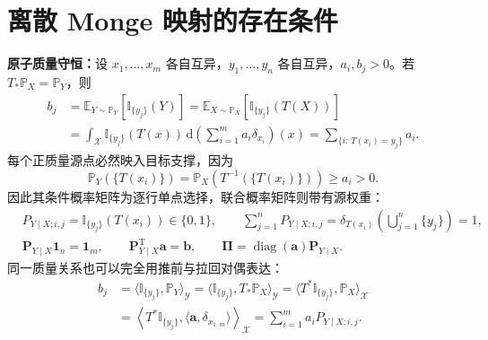 \section{离散 Monge 映射的存在条件}\label{cw:app:monge}

\textbf{原子质量守恒：}设 $x_1,\dots,x_m$ 各自互异，$y_1,\dots,y_n$ 各自互异，$a_i,b_j>0$。若 $T_*\mathbb P_X=\mathbb P_Y$，则
\begin{equation}\label{cw:eq:monge-atom-mass}
\begin{aligned}
b_j&=\mathbb E_{Y\sim\mathbb P_Y}[\mathbb I_{\{y_j\}}(Y)]
=\mathbb E_{X\sim\mathbb P_X}[\mathbb I_{\{y_j\}}(T(X))]\\
&=\int_{\mathcal X}\mathbb I_{\{y_j\}}(T(x))\,
\mathrm d\!\left(\sum_{i=1}^m a_i\delta_{x_i}\right)(x)
=\sum_{\{i:\,T(x_i)=y_j\}}a_i.
\end{aligned}
\end{equation}
每个正质量源点必然映入目标支撑，因为
\begin{equation}\label{cw:eq:monge-support}
\mathbb P_Y(\{T(x_i)\})
=\mathbb P_X(T^{-1}(\{T(x_i)\}))\ge a_i>0.
\end{equation}
因此其条件概率矩阵为逐行单点选择，联合概率矩阵则带有源权重：
\begin{equation}\label{cw:eq:monge-conditional}
\begin{aligned}
&P_{Y\mid X;i,j}=\mathbb I_{\{y_j\}}(T(x_i))\in\{0,1\},\qquad
\sum_{j=1}^n P_{Y\mid X;i,j}
=\delta_{T(x_i)}\!\left(\bigcup_{j=1}^n\{y_j\}\right)=1,\\
&\bm P_{Y\mid X}\mathbf1_n=\mathbf1_m,\qquad
\bm P_{Y\mid X}^{\mathrm T}\bm a=\bm b,\qquad
\bm\Pi=\operatorname{diag}(\bm a)\bm P_{Y\mid X}.
\end{aligned}
\end{equation}
同一质量关系也可以完全用推前与拉回对偶表达：
\begin{equation}\label{cw:eq:monge-duality}
\begin{aligned}
b_j&=\langle\mathbb I_{\{y_j\}},\mathbb P_Y\rangle_{\mathcal Y}
=\langle\mathbb I_{\{y_j\}},T_*\mathbb P_X\rangle_{\mathcal Y}
=\langle T^*\mathbb I_{\{y_j\}},\mathbb P_X\rangle_{\mathcal X}\\
&=\left\langle T^*\mathbb I_{\{y_j\}},
\langle\bm a,\delta_{x_{1..m}}\rangle\right\rangle_{\mathcal X}
=\sum_{i=1}^m a_iP_{Y\mid X;i,j}.
\end{aligned}
\end{equation}

